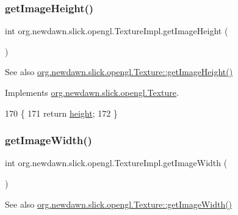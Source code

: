 \subsubsection{\texorpdfstring{get\+Image\+Height()}{getImageHeight()}}
{\footnotesize\ttfamily int org.\+newdawn.\+slick.\+opengl.\+Texture\+Impl.\+get\+Image\+Height (\begin{DoxyParamCaption}{ }\end{DoxyParamCaption})\hspace{0.3cm}{\ttfamily [inline]}}

\begin{DoxySeeAlso}{See also}
\mbox{\hyperlink{interfaceorg_1_1newdawn_1_1slick_1_1opengl_1_1_texture_afe73affbe5e20e047f6364ce7b61d7d2}{org.\+newdawn.\+slick.\+opengl.\+Texture\+::get\+Image\+Height()}} 
\end{DoxySeeAlso}


Implements \mbox{\hyperlink{interfaceorg_1_1newdawn_1_1slick_1_1opengl_1_1_texture_afe73affbe5e20e047f6364ce7b61d7d2}{org.\+newdawn.\+slick.\+opengl.\+Texture}}.


\begin{DoxyCode}
170                                 \{
171         \textcolor{keywordflow}{return} \mbox{\hyperlink{classorg_1_1newdawn_1_1slick_1_1opengl_1_1_texture_impl_a53e8d062d8f983a3a1a845d34bdbd834}{height}};
172     \}
\end{DoxyCode}
\mbox{\label{classorg_1_1newdawn_1_1slick_1_1opengl_1_1_texture_impl_a2f52648ca0e408f5b5f7c34a71634a26}} 
\subsubsection{\texorpdfstring{get\+Image\+Width()}{getImageWidth()}}
{\footnotesize\ttfamily int org.\+newdawn.\+slick.\+opengl.\+Texture\+Impl.\+get\+Image\+Width (\begin{DoxyParamCaption}{ }\end{DoxyParamCaption})\hspace{0.3cm}{\ttfamily [inline]}}

\begin{DoxySeeAlso}{See also}
\mbox{\hyperlink{interfaceorg_1_1newdawn_1_1slick_1_1opengl_1_1_texture_a7dadcef354aaed97a0fe03f1978ee5f8}{org.\+newdawn.\+slick.\+opengl.\+Texture\+::get\+Image\+Width()}} 
\end{DoxySeeAlso}


